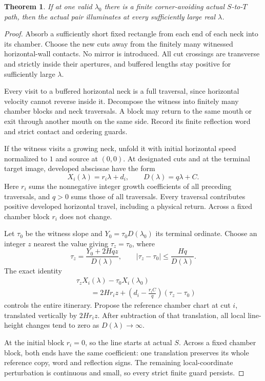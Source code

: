 \documentclass[11pt]{article}
\newtheorem{theorem}{Theorem}[section]
\theoremstyle{definition}
\begin{document}
\begin{theorem}\label{thm:tree}
If at one valid $\lambda_0$ there is a finite corner-avoiding actual $S$-to-$T$ path, then the actual pair illuminates at every sufficiently large real $\lambda$.
\end{theorem}
\begin{proof}
Absorb a sufficiently short fixed rectangle from each end of each neck into its chamber. Choose the new cuts away from the finitely many witnessed horizontal-wall contacts. No mirror is introduced. All cut crossings are transverse and strictly inside their apertures, and buffered lengths stay positive for sufficiently large $\lambda$.

Every visit to a buffered horizontal neck is a full traversal, since horizontal velocity cannot reverse inside it. Decompose the witness into finitely many chamber blocks and neck traversals. A block may return to the same mouth or exit through another mouth on the same side. Record its finite reflection word and strict contact and ordering guards.

If the witness visits a growing neck, unfold it with initial horizontal speed normalized to $1$ and source at $(0,0)$. At designated cuts and at the terminal target image, developed abscissae have the form
\[
 X_i(\lambda)=r_i\lambda+d_i,\qquad D(\lambda)=q\lambda+C.
\]
Here $r_i$ sums the nonnegative integer growth coefficients of all preceding traversals, and $q>0$ sums those of all traversals. Every traversal contributes positive developed horizontal travel, including a physical return. Across a fixed chamber block $r_i$ does not change.

Let $\tau_0$ be the witness slope and $Y_0=\tau_0D(\lambda_0)$ its terminal ordinate. Choose an integer $z$ nearest the value giving $\tau_z=\tau_0$, where
\[
 \tau_z=\frac{Y_0+2Hqz}{D(\lambda)},\qquad
 |\tau_z-\tau_0|\le\frac{Hq}{D(\lambda)}.
\]
The exact identity
\begin{align*}
 &\tau_zX_i(\lambda)-\tau_0X_i(\lambda_0)\\
 &\qquad=2Hr_i z+\left(d_i-\frac{r_iC}{q}\right)(\tau_z-\tau_0)
\end{align*}
controls the entire itinerary. Propose the reference chamber chart at cut $i$, translated vertically by $2Hr_i z$. After subtraction of that translation, all local line-height changes tend to zero as $D(\lambda)\to\infty$.

At the initial block $r_i=0$, so the line starts at actual $S$. Across a fixed chamber block, both ends have the same coefficient: one translation preserves its whole reference copy, word and reflection signs. The remaining local-coordinate perturbation is continuous and small, so every strict finite guard persists.


\end{proof}
\end{document}
